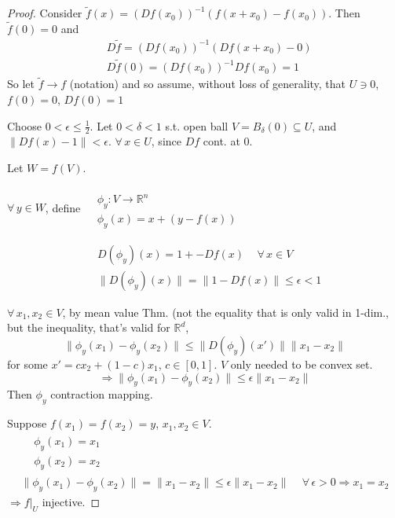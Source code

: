 \documentclass[10pt]{amsart}
\begin{document}
\begin{multicols*}{2}
\begin{proof}
Consider $\widetilde{f}(x) = (Df(x_0))^{-1}(f(x+x_0) - f(x_0))$.  Then \\
\phantom{Consider} $\widetilde{f}(0) = 0$ and 
\[
\begin{aligned}
  &  D\widetilde{f}= (Df(x_0))^{-1}(Df(x+x_0) -0)  \\
  & D\widetilde{f}(0) = (Df(x_0))^{-1}Df(x_0)=1
\end{aligned}
\]  
So let $\widetilde{f}\to f$ (notation) and so assume, without loss of generality, that $U\ni 0$, $f(0)=0$, $Df(0)=1$

Choose $0 < \epsilon \leq \frac{1}{2}$.  Let $0< \delta <1$ s.t. open ball $V = B_{\delta}(0) \subseteq U$, and $\| Df(x)-1\| < \epsilon$.  $\forall \, x \in U$, since $Df$ cont. at $0$.  

Let $W=f(V)$.  

$\forall \, y \in W$, define $\begin{aligned} & \quad \\
  & \phi_y : V \to \mathbb{R}^n \\
  & \phi_y(x) = x + (y-f(x))\end{aligned}$

\[
\begin{aligned}
  & D(\phi_y)(x) = 1 + - Df(x) \quad \, \forall \, x \in V \\ 
  & \| D(\phi_y)(x) \| = \| 1 - Df(x) \| \leq \epsilon <1
\end{aligned}
\]

$\forall \, x_1 ,x_2 \in V$, by mean value Thm. (not the equality that is only valid in 1-dim., but the inequality, that's valid for $\mathbb{R}^d$, 
\[
\| \phi_y(x_1) - \phi_y(x_2) \| \leq \| D(\phi_y)(x') \| \| x_1 - x_2 \| 
\]
for some $x' = cx_2 + (1-c)x_1$, $c\in [0,1]$.  $V$ only needed to be convex set.  
\[
\Longrightarrow \| \phi_y(x_1) - \phi_y(x_2) \| \leq \epsilon \| x_1 - x_2 \|
\]
Then $\phi_y$ contraction mapping.  

Suppose $f(x_1) = f(x_2)=y$, $x_1,x_2 \in V$.  
\[
\begin{gathered}
\begin{aligned}
  & \phi_y(x_1) =x_1 \\ 
  & \phi_y(x_2) =x_2  
\end{aligned} \\
\| \phi_y(x_1) - \phi_y(x_2) \| = \| x_1 - x_2 \| \leq \epsilon \| x_1 - x_2 \| \quad \, \forall \, \epsilon > 0 \Longrightarrow x_1 = x_2 
\end{gathered}
\]
$\Longrightarrow \left. f\right|_U$ injective.


\end{proof}
\end{multicols*}
\end{document}
